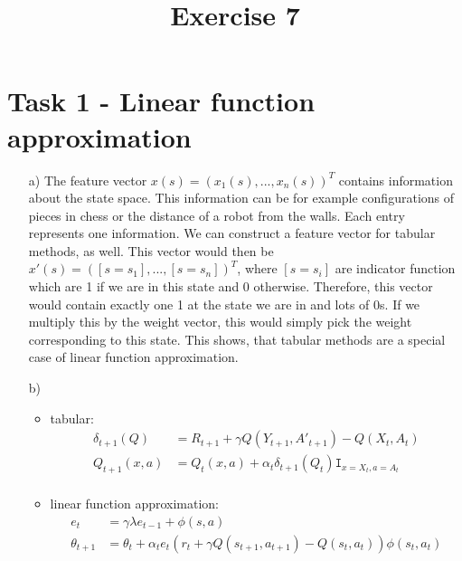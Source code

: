 \documentclass[a4paper]{article}
\date{}
\author{}
\title{\textbf{Exercise 7}}
\begin{document}
\maketitle 
\thispagestyle{fancy}

\section*{Task 1 - Linear function approximation}

\begin{enumerate}
	\item[a)] The feature vector $x(s) = (x_1(s), ..., x_n(s))^T$ contains information about the state space. 
	This information can be for example configurations of pieces in chess or the distance of a robot from the walls. 
	Each entry represents one information.
	We can construct a feature vector for tabular methods, as well. 
	This vector would then be $x'(s) = ([s = s_1], ..., [s = s_n])^T$, where $[s = s_i]$ are indicator function which are 1 if we are in this state and 0 otherwise. 
	Therefore, this vector would contain exactly one 1 at the state we are in and lots of 0s. 
	If we multiply this by the weight vector, this would simply pick the weight corresponding to this state. 
	This shows, that tabular methods are a special case of linear function approximation.
	
	\item[b)] 
	\begin{itemize}
		\item tabular:
		\begin{align*}
				\delta_{t+1}(Q) &= R_{t+1} + \gamma Q(Y_{t+1}, A'_{t+1}) - Q(X_t, A_t) \\
				Q_{t+1}(x, a) &= Q_t(x,a) + \alpha_t \delta_{t+1}(Q_t)\mathtt{I}_{x = X_t, a=A_t}\\		
		\end{align*}
		\item linear function approximation: 
		\begin{align*}
			e_t &= \gamma \lambda e_{t-1} + \phi(s, a) \\
			\theta_{t+1} &= \theta_{t} + \alpha_t e_t (r_t + \gamma Q(s_{t+1}, a_{t+1}) - Q(s_t, a_t))\phi(s_t, a_t) \\
		\end{align*}
	\end{itemize}
	
\end{enumerate}
\end{document}
